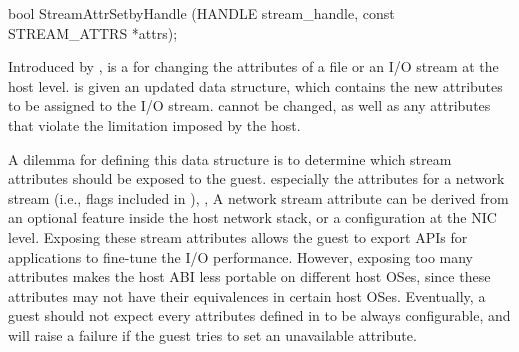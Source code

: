 \begin{paldef}
bool StreamAttrSetbyHandle (HANDLE stream_handle,
                            const STREAM_ATTRS *attrs);
\end{paldef}


Introduced by \graphene{},
 is a \hostapi{} for changing
the attributes of a file or an I/O stream
at the host level.
 is given an updated  data structure,
which contains the new attributes to be assigned to the I/O stream.
 cannot be changed, as well as any attributes that violate the limitation imposed by the host.


A dilemma for defining this  data structure is
to determine which stream attributes
should be exposed to the guest.
especially the attributes for a network stream (i.e., flags included in ), ,
A network stream attribute can be derived from an optional feature inside the host network stack,
or a configuration at the NIC level.
Exposing these stream attributes allows the guest to export APIs for applications
to fine-tune the I/O performance.
However, exposing too many attributes makes the host ABI
less portable on different host OSes, since these attributes may not have their equivalences in certain host OSes.
Eventually, a guest should not expect every attributes defined in  to be always configurable,
and  will raise a failure
if the guest tries to set an unavailable attribute.













